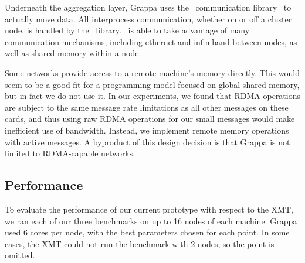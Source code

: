 Underneath the aggregation layer, Grappa uses the \gasnet~communication
library~\cite{gasnet} to actually move data. All interprocess communication,
whether on or off a cluster node, is handled by the \gasnet~library.
\gasnet~is able to take advantage of many communication mechanisms, including
ethernet and infiniband between nodes, as well as shared memory within a node.

Some networks provide access to a remote machine's memory directly. This would
seem to be a good fit for a programming model focused on global shared memory,
but in fact we do not use it. In our experiments, we found that RDMA
operations are subject to the same message rate limitations as all other
messages on these cards, and thus using raw RDMA operations for our small
messages would make inefficient use of bandwidth. Instead, we implement remote
memory operations with active messages. A byproduct of this design decision is
that Grappa is not limited to RDMA-capable networks.

\subsection{Performance}

To evaluate the performance of our current prototype with respect to the XMT,
we ran each of our three benchmarks on up to 16 nodes of each machine. Grappa
used 6 cores per node, with the best parameters chosen for each point. In some
cases, the XMT could not run the benchmark with 2 nodes, so the point is
omitted.

